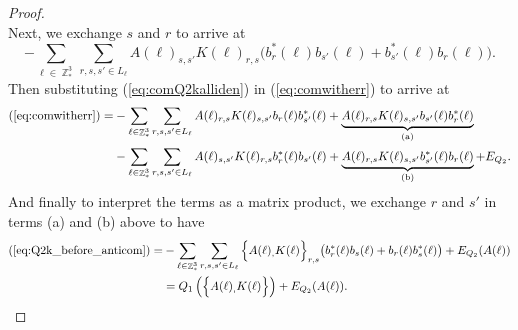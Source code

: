 \documentclass[sn-mathphys,Numbered, a4paper ,nocrop]{sn-jnl}%
\DeclareMathOperator{\Z}{\mathbb{Z}}
\theoremstyle{plain}
\theoremstyle{definition}
\theoremstyle{remark}
\theoremstyle{plain}
\theoremstyle{definition}
\theoremstyle{remark}
\begin{document}
\begin{proof}
\begin{equation}
\end{equation}
Next, we exchange $s$ and $r$ to arrive at
\begin{equation}\label{eq:comQ2kalliden}
   -\sum\limits_{\ell \in \Z^3_*}\sum\limits_{r,s,s' \in L_{\ell}}A(\ell)_{s,s'} K(\ell)_{r,s}\big(b^*_{r}(\ell)b_{s'}(\ell) + b^*_{s'}(\ell)b_{r}(\ell)\big).
\end{equation}
Then substituting (\ref{eq:comQ2kalliden}) in (\ref{eq:comwitherr}) to arrive at
\begin{align}
    (\ref{eq:comwitherr})=&-\sum\limits_{\ell \in \Z^3_*}\sum\limits_{r,s,s' \in L_{\ell}}A(\ell)_{r,s}
        K(\ell)_{s,s'}b_{r}(\ell)b^*_{s'}(\ell)+\underbrace{A(\ell)_{r,s}
        K(\ell)_{s,s'}b_{s'}(\ell)b^*_{r}(\ell)}_{\text{(a)}}\nonumber\\ &-\sum\limits_{\ell \in \Z^3_*}\sum\limits_{r,s,s' \in L_{\ell}}A(\ell)_{s,s'} K(\ell)_{r,s}b^*_{r}(\ell)b_{s'}(\ell) + \underbrace{A(\ell)_{r,s}
        K(\ell)_{s,s'}b^*_{s'}(\ell)b_{r}(\ell)}_{\text{(b)}} + E_{Q_2}.\label{eq:Q2k_before_anticom}
\end{align}
And finally to interpret the terms as a matrix product, we exchange $r$ and $s'$ in terms (a) and (b) above to have 
\begin{align}
    (\ref{eq:Q2k_before_anticom}) = &-\sum\limits_{\ell \in \Z^3_*}\sum\limits_{r,s,s' \in L_{\ell}}\Big\{A(\ell)_
        ,K(\ell)\Big\}_{r,s}\big(b^*_{r}(\ell)b_{s}(\ell)+b_{r}(\ell)b^*_{s}(\ell) \big)\nonumber + E_{Q_2}(A(\ell))\\
        &= Q_1\left(\Big\{A(\ell)_
        ,K(\ell)\Big\}\right) + E_{Q_2}(A(\ell)).
\end{align}
\end{proof}
\newpage
\end{document}
